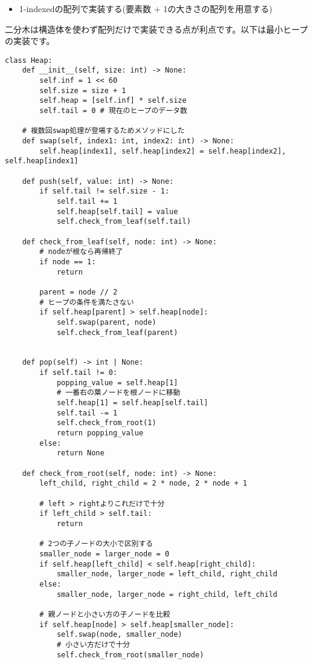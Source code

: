 \documentclass{jlreq}
\begin{document}
\begin{itemize}
	\item 1-indexedの配列で実装する(要素数 + 1の大きさの配列を用意する)
\end{itemize}


二分木は構造体を使わず配列だけで実装できる点が利点です。以下は最小ヒープの実装です。

\begin{lstlisting}[caption=二分ヒープの実装, label=binaryheap, frame=TRBL, label={binaryheap}]
class Heap:
	def __init__(self, size: int) -> None:
		self.inf = 1 << 60
		self.size = size + 1
		self.heap = [self.inf] * self.size
		self.tail = 0 # 現在のヒープのデータ数
		
	# 複数回swap処理が登場するためメソッドにした
	def swap(self, index1: int, index2: int) -> None:
		self.heap[index1], self.heap[index2] = self.heap[index2], self.heap[index1]

	def push(self, value: int) -> None:
		if self.tail != self.size - 1:
			self.tail += 1
			self.heap[self.tail] = value
			self.check_from_leaf(self.tail)

	def check_from_leaf(self, node: int) -> None:
		# nodeが根なら再帰終了
		if node == 1:
			return
		
		parent = node // 2
		# ヒープの条件を満たさない
		if self.heap[parent] > self.heap[node]:
			self.swap(parent, node)
			self.check_from_leaf(parent)
		

	def pop(self) -> int | None:
		if self.tail != 0:
			popping_value = self.heap[1]
			# 一番右の葉ノードを根ノードに移動
			self.heap[1] = self.heap[self.tail]
			self.tail -= 1
			self.check_from_root(1)
			return popping_value
		else:
			return None

	def check_from_root(self, node: int) -> None:
		left_child, right_child = 2 * node, 2 * node + 1
		
		# left > rightよりこれだけで十分
		if left_child > self.tail:
			return
		
		# 2つの子ノードの大小で区別する
		smaller_node = larger_node = 0
		if self.heap[left_child] < self.heap[right_child]:
			smaller_node, larger_node = left_child, right_child
		else:
			smaller_node, larger_node = right_child, left_child
		
		# 親ノードと小さい方の子ノードを比較
		if self.heap[node] > self.heap[smaller_node]:
			self.swap(node, smaller_node)
			# 小さい方だけで十分
			self.check_from_root(smaller_node)

\end{lstlisting}
\end{document}
